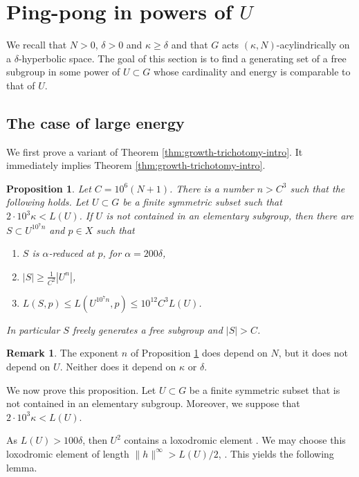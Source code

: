 \documentclass[leqno,a4paper,10pt]{amsart}
\theoremstyle{plain}
\newtheorem{prop}[thm]{Proposition}
\theoremstyle{definition}
\newtheorem{rem}[thm]{Remark}
\theoremstyle{remark}
\renewcommand{\geq}{\geqslant}
\let\le\leqslant
\let\geq\geqslant
\begin{document}
\section{Ping-pong in powers of $U$}

We recall that $N>0$, $\delta >0$ and $\kappa\geq \delta$ and that $G$ acts $(\kappa,N)$-acylindrically on a $\delta$-hyperbolic space.  The goal of this section is to find a generating set of a free subgroup in some power of $U\subset G$ whose cardinality and energy is comparable to that of $U$.

\subsection{The case of large energy}

We first prove a variant of Theorem \ref{thm:growth-trichotomy-intro}. It immediately implies Theorem \ref{thm:growth-trichotomy-intro}.

\begin{prop}\label{P:Pingpong_intro}  Let $C=10^6(N+1)$.  There is a number  $n>C^3$ such that the following holds. Let $U\subset G$ be a finite symmetric subset  such that $2\cdot 10^3\kappa < L(U)$. If $U$ is not contained in an elementary subgroup,  then there are $S\subset U^{10^7n}$ and $p\in X$ such that 
\begin{enumerate}
\item $S$ is $\alpha$-reduced at $p$, for $\alpha=200\delta$,
\item $|S| \geqslant \frac{1}{C^2}|U^n|$,
\item $L(S,p)\le L(U^{10^7n},p)\leqslant 10^{12} C^3 L(U)$.
\end{enumerate}
In particular $S$ freely generates a free subgroup and $|S|>C$. 
\end{prop}

\begin{rem} The exponent $n$ of Proposition \ref{P:Pingpong_intro} does depend on $N$, but it does not depend on $U$. Neither does it depend on $\kappa$ or $\delta$. 
\end{rem}


We now prove this proposition. Let $U\subset G$ be a finite symmetric subset that is not contained in an elementary subgroup. Moreover, we suppose that $2\cdot 10^3\kappa< L(U)$. 

As $L(U) >100\delta$, then $U^2$ contains a loxodromic element \cite[Proposition 3.2]{koubi_croissance_1998}. We may choose this loxodromic element of length $\|h\|^{\infty}>L(U)/2$, \cite[Lemma 7]{arzhantseva_lower_2006} \cite[Theorem 5.7]{breuillard_joint_2021} \cite[Lemma 2.7]{fujiwara_rates_2021}. This yields the following lemma.
\end{document}
